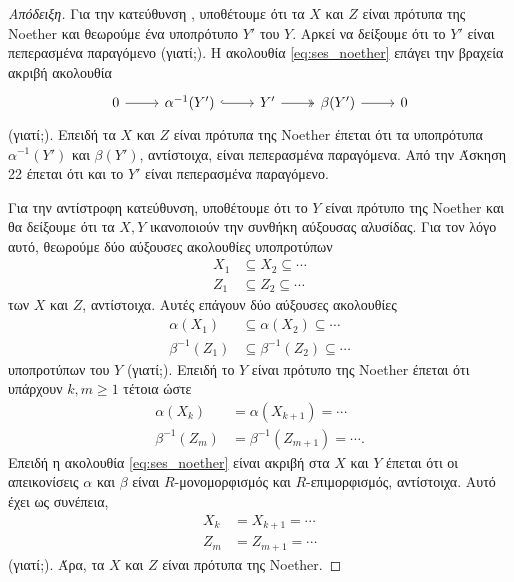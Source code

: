 \documentclass[12pt,a4paper,reqno]{amsart}
\theoremstyle{definition}
\theoremstyle{remark}
\numberwithin{theorem}{section}
\numberwithin{exercise}{section}
\numberwithin{equation}{section}
\newcommand{\then}{\Rightarrow}
\begin{document}
\begin{proof}[Απόδειξη]
    Για την κατεύθυνση \textquote{$(2) \then (1)$}, υποθέτουμε ότι τα $X$ και $Z$ είναι πρότυπα της Noether και θεωρούμε ένα υποπρότυπο $Y'$ του $Y$. Αρκεί να δείξουμε ότι το $Y'$ είναι πεπερασμένα παραγόμενο (γιατί;). Η ακολουθία \eqref{eq:ses_noether} επάγει την βραχεία ακριβή ακολουθία 
    \[
    \begin{tikzcd}
        0 \arrow[r] & \alpha^{-1}(Y') \arrow[r, hook] & Y' \arrow[r, two heads] & \beta(Y') \arrow[r] & 0
    \end{tikzcd}
    \] 
    (γιατί;). Επειδή τα $X$ και $Z$ είναι πρότυπα της Noether έπεται ότι τα υποπρότυπα $\alpha^{-1}(Y')$ και $\beta(Y')$, αντίστοιχα, είναι πεπερασμένα παραγόμενα. Από την Άσκηση 22 έπεται ότι και το $Y'$ είναι πεπερασμένα παραγόμενο.

    Για την αντίστροφη κατεύθυνση, υποθέτουμε ότι το $Y$ είναι πρότυπο της Noether και θα δείξουμε ότι τα $X, Y$ ικανοποιούν την συνθήκη αύξουσας αλυσίδας. Για τον λόγο αυτό, θεωρούμε δύο αύξουσες ακολουθίες υποπροτύπων
    \begin{align*}
        X_1 &\subseteq X_2 \subseteq \cdots \\
        Z_1 &\subseteq Z_2 \subseteq \cdots 
    \end{align*}
    των $X$ και $Z$, αντίστοιχα. Αυτές επάγουν δύο αύξουσες ακολουθίες  
    \begin{align*}
        \alpha(X_1) &\subseteq \alpha(X_2) \subseteq \cdots \\
        \beta^{-1}(Z_1) &\subseteq \beta^{-1}(Z_2) \subseteq \cdots 
    \end{align*}
    υποπροτύπων του $Y$ (γιατί;). Επειδή το $Y$ είναι πρότυπο της Noether έπεται ότι υπάρχουν $k, m \ge 1$ τέτοια ώστε 
    \begin{align*}
        \alpha(X_k) &= \alpha(X_{k+1}) = \cdots \\
        \beta^{-1}(Z_m) &= \beta^{-1}(Z_{m+1}) = \cdots. 
    \end{align*}
    Επειδή η ακολουθία \eqref{eq:ses_noether} είναι ακριβή στα $X$ και $Y$ έπεται ότι οι απεικονίσεις $\alpha$ και $\beta$ είναι $R$-μονομορφισμός και $R$-επιμορφισμός, αντίστοιχα. Αυτό έχει ως συνέπεια, 
    \begin{align*}
        X_k &= X_{k+1} = \cdots \\
        Z_m &= Z_{m+1} = \cdots
    \end{align*}
    (γιατί;). Άρα, τα $X$ και $Z$ είναι πρότυπα της Noether.
\end{proof}
\end{document}
